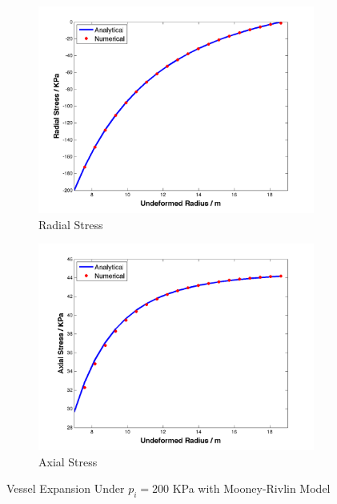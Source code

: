 \begin{figure}[t!p]
	\begin{subfigure}[b]{0.5\textwidth}
		\centering
		\includegraphics[width=\textwidth]{./figures/radial_stress_200.png}
		\caption{Radial Stress}
		\label{radial_200}
	\end{subfigure}
	\begin{subfigure}[b]{0.5\textwidth}
		\centering
		\includegraphics[width=\textwidth]{./figures/axial_stress_200.png}
		\caption{Axial Stress}
		\label{axial_200}
	\end{subfigure}
	\caption{Vessel Expansion Under $p_i = 200$ KPa with Mooney-Rivlin Model}
	\label{fig:mooney-rivlin1}
\end{figure}


